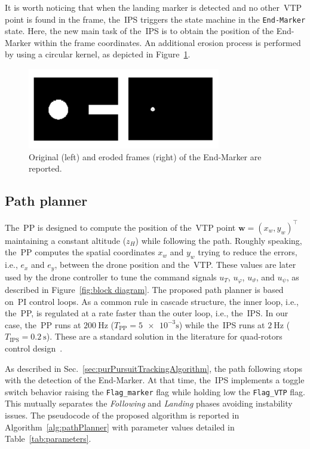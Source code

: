 It is worth noticing that when the landing marker is detected and no other~\gls{VTP} point is found in the frame, the~\gls{IPS} triggers the state machine in the \texttt{End-Marker} state. Here, the new main task of the~\gls{IPS} is to obtain the position of the End-Marker within the frame coordinates. An additional erosion process is performed by using a circular kernel, as depicted in Figure~\ref{fig:End_marker}. 

\begin{figure}
	\centering
	\includegraphics[width=0.75\textwidth]{figure/Part1/Chapter3/figures/land_marker.png}
	\caption{Original (left) and eroded frames (right) of the End-Marker are reported.}
	\label{fig:End_marker}
\end{figure}

\subsection{Path planner}
\label{sec:pathPlanner}

The~\gls{PP} is designed to compute the position of the~\gls{VTP} point $\mathbf{w} = (x_w, y_w)^\top$ maintaining a constant altitude ($z_H$) while following the path. Roughly speaking, the~\gls{PP} computes the spatial coordinates $x_w$ and $y_w$ trying to reduce the errors, i.e., $e_x$ and $e_y$, between the drone position and the~\gls{VTP}. These values are later used by the drone controller to tune the command signals $u_T$, $u_\varphi$, $u_\vartheta$, and $u_\psi$, as described in Figure~\ref{fig:block diagram}. The proposed path planner is based on~\gls{PI} control loops. As a common rule in cascade structure, the inner loop, i.e., the~\gls{PP}, is regulated at a rate faster than the outer loop, i.e., the~\gls{IPS}. In our case, the~\gls{PP} runs at $\SI{200}{\hertz}$ ($T_\mathrm{PP} = \num{5e-3} \si{\second}$) while the~\gls{IPS} runs at $\SI{2}{\hertz}$ ($T_\mathrm{IPS} = \SI{0.2}{\second}$). These are a standard solution in the literature for quad-rotors control design~\cite{Dief2015}.

As described in Sec.~\ref{sec:purPursuitTrackingAlgorithm}, the path following stops with the detection of the End-Marker. At that time, the~\gls{IPS} implements a toggle switch behavior raising the \texttt{Flag\_marker} flag while holding low the \texttt{Flag\_VTP} flag. This mutually separates the \textit{Following} and \textit{Landing} phases avoiding instability issues. The pseudocode of the proposed algorithm is reported in Algorithm~\ref{alg:pathPlanner} with parameter values detailed in Table~\ref{tab:parameters}.

